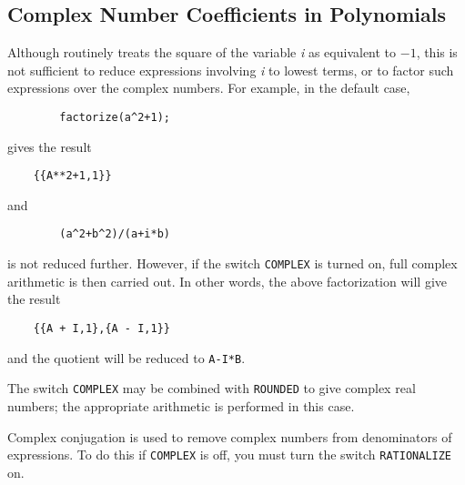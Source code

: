 \subsection{Complex Number Coefficients in Polynomials}
Although {\REDUCE} routinely treats the square of the variable {\em i\/} as
equivalent to $-1$, this is not sufficient to reduce expressions involving
{\em i\/} to lowest terms, or to factor such expressions over the complex
numbers.  For example, in the default case,
\begin{verbatim}
        factorize(a^2+1);
\end{verbatim}
gives the result
\begin{verbatim}
	{{A**2+1,1}}
\end{verbatim}
and
\begin{verbatim}
        (a^2+b^2)/(a+i*b)
\end{verbatim}
is not reduced further.  However, if the switch
{\tt COMPLEX} is turned on, full complex arithmetic is then
carried out.  In other words, the above factorization will give the result
\begin{verbatim}
	{{A + I,1},{A - I,1}}
\end{verbatim}
and the quotient will be reduced to {\tt A-I*B}.

The switch {\tt COMPLEX} may be combined with {\tt ROUNDED} to give complex
real numbers; the appropriate arithmetic is performed in this case.

Complex conjugation is used to remove complex numbers from denominators of
expressions.  To do this if {\tt COMPLEX} is off, you must turn the switch
{\tt RATIONALIZE} on.

